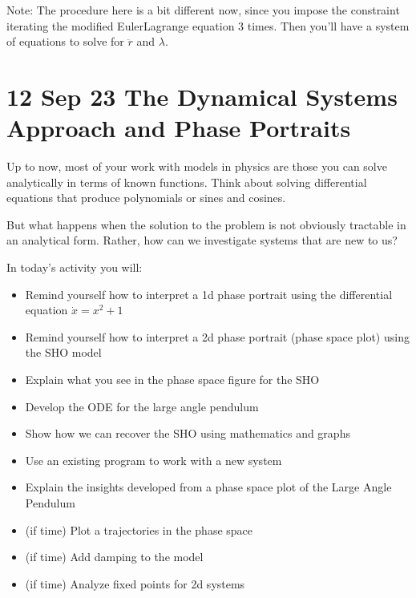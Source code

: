 \documentclass[letterpaper,10pt,english]{jupyterBook}
\begin{document}
\sphinxAtStartPar
Note: The procedure here is a bit different now, since you impose the constraint  iterating the modified Euler\sphinxhyphen{}Lagrange equation 3 times. Then you’ll have a system of equations to solve for \(\ddot{r}\) and \(\lambda\).

\sphinxstepscope


\chapter{12 Sep 23 \sphinxhyphen{} The Dynamical Systems Approach and Phase Portraits}
\label{\detokenize{content/1_mechanics/dynamical_1:sep-23-the-dynamical-systems-approach-and-phase-portraits}}\label{\detokenize{content/1_mechanics/dynamical_1::doc}}
\sphinxAtStartPar
Up to now, most of your work with models in physics are those you can solve analytically in terms of known functions. Think about solving differential equations that produce polynomials or sines and cosines.

\sphinxAtStartPar
But what happens when the solution to the problem is not obviously tractable in an analytical form. Rather, how can we investigate systems that are new to us?

\sphinxAtStartPar
In today’s activity you will:
\begin{itemize}
\item {} 
\sphinxAtStartPar
Remind yourself how to interpret a 1d phase portrait using the differential equation \(\dot{x} = x^2 + 1\)

\item {} 
\sphinxAtStartPar
Remind yourself how to interpret a 2d phase portrait (phase space plot) using the SHO model

\item {} 
\sphinxAtStartPar
Explain what you see in the phase space figure for the SHO

\item {} 
\sphinxAtStartPar
Develop the ODE for the large angle pendulum

\item {} 
\sphinxAtStartPar
Show how we can recover the SHO using mathematics and graphs

\item {} 
\sphinxAtStartPar
Use an existing program to work with a new system

\item {} 
\sphinxAtStartPar
Explain the insights developed from a phase space plot of the Large Angle Pendulum

\item {} 
\sphinxAtStartPar
(if time) Plot a trajectories in the phase space

\item {} 
\sphinxAtStartPar
(if time) Add damping to the model

\item {} 
\sphinxAtStartPar
(if time) Analyze fixed points for 2d systems

\end{itemize}
\end{document}
